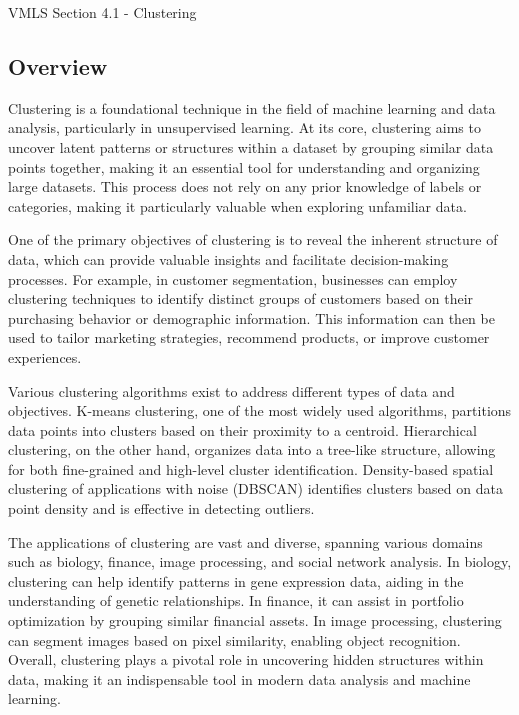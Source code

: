 \begin{notes}{VMLS Section 4.1 - Clustering}
    \subsection*{Overview}

    Clustering is a foundational technique in the field of machine learning and data analysis, particularly in unsupervised learning. At its core, clustering aims to uncover latent patterns or 
    structures within a dataset by grouping similar data points together, making it an essential tool for understanding and organizing large datasets. This process does not rely on any prior 
    knowledge of labels or categories, making it particularly valuable when exploring unfamiliar data.

    One of the primary objectives of clustering is to reveal the inherent structure of data, which can provide valuable insights and facilitate decision-making processes. For example, in customer 
    segmentation, businesses can employ clustering techniques to identify distinct groups of customers based on their purchasing behavior or demographic information. This information can then be 
    used to tailor marketing strategies, recommend products, or improve customer experiences.

    Various clustering algorithms exist to address different types of data and objectives. K-means clustering, one of the most widely used algorithms, partitions data points into clusters based on 
    their proximity to a centroid. Hierarchical clustering, on the other hand, organizes data into a tree-like structure, allowing for both fine-grained and high-level cluster identification. 
    Density-based spatial clustering of applications with noise (DBSCAN) identifies clusters based on data point density and is effective in detecting outliers.

    The applications of clustering are vast and diverse, spanning various domains such as biology, finance, image processing, and social network analysis. In biology, clustering can help identify 
    patterns in gene expression data, aiding in the understanding of genetic relationships. In finance, it can assist in portfolio optimization by grouping similar financial assets. In image processing, 
    clustering can segment images based on pixel similarity, enabling object recognition. Overall, clustering plays a pivotal role in uncovering hidden structures within data, making it an indispensable 
    tool in modern data analysis and machine learning.
\end{notes}

